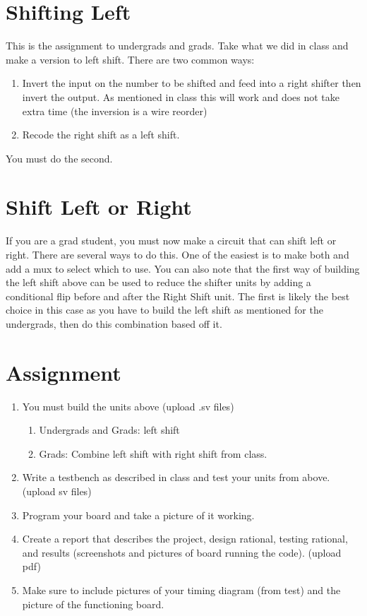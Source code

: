 \section{Shifting Left}

This is the assignment to undergrads and grads.  Take what we did in class and make a version to left shift.  There are two common ways:
\begin{enumerate}
  \item Invert the input on the number to be shifted and feed into a right shifter then invert the output.  As mentioned in class this will work and does not take extra time (the inversion is a wire reorder)
  \item Recode the right shift as a left shift.
\end{enumerate}
You must do the second.

\section{Shift Left or Right}

If you are a grad student, you must now make a circuit that can shift left or right.  There are several ways to do this.  One of the easiest is to make both and add a mux to select which to use. You can also note that the first way of building the left shift above can be used to reduce the shifter units by adding a conditional flip before and after the Right Shift unit.  The first is likely the best choice in this case as you have to build the left shift as mentioned for the undergrads, then do this combination based off it.

\section{Assignment}
 
\begin{enumerate}
\item You must build the units above (upload .sv files)
   \begin{enumerate}
   \item Undergrads and Grads: left shift
   \item Grads: Combine left shift with right shift from class.
   \end{enumerate}
\item Write a testbench as described in class and test your units from above. (upload sv files)
\item Program your board and take a picture of it working.
\item Create a report that describes the project, design rational, testing rational, and results (screenshots and pictures of board running the code). (upload pdf)
\item Make sure to include pictures of your timing diagram (from test) and the picture of the functioning board.
\end{enumerate}
  